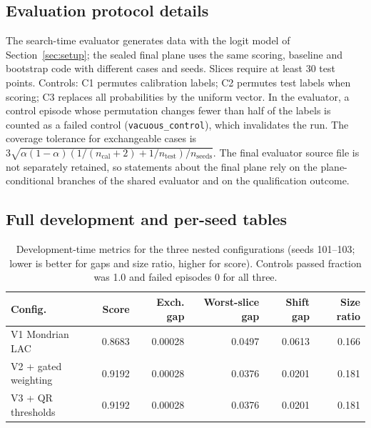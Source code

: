\documentclass{article}
\begin{document}
\subsection{Evaluation protocol details}
The search-time evaluator generates data with the logit model of Section~\ref{sec:setup}; the sealed final plane uses the same scoring, baseline and bootstrap code with different cases and seeds. Slices require at least 30 test points. Controls: C1 permutes calibration labels; C2 permutes test labels when scoring; C3 replaces all probabilities by the uniform vector. In the evaluator, a control episode whose permutation changes fewer than half of the labels is counted as a failed control (\texttt{vacuous\_control}), which invalidates the run. The coverage tolerance for exchangeable cases is $3\sqrt{\alpha(1-\alpha)(1/(n_{\mathrm{cal}}+2)+1/n_{\mathrm{test}})/n_{\mathrm{seeds}}}$. The final evaluator source file is not separately retained, so statements about the final plane rely on the plane-conditional branches of the shared evaluator and on the qualification outcome.

\subsection{Full development and per-seed tables}
\begin{table}[h]
\centering
\caption{Development-time metrics for the three nested configurations (seeds 101--103; lower is better for gaps and size ratio, higher for score). Controls passed fraction was 1.0 and failed episodes 0 for all three.}
\label{tab:dev}
\begin{tabular}{lrrrrr}
\toprule
Config. & Score & Exch. gap & Worst-slice gap & Shift gap & Size ratio \\
\midrule
V1 Mondrian LAC & 0.8683 & 0.00028 & 0.0497 & 0.0613 & 0.166 \\
V2 + gated weighting & 0.9192 & 0.00028 & 0.0376 & 0.0201 & 0.181 \\
V3 + QR thresholds & 0.9192 & 0.00028 & 0.0376 & 0.0201 & 0.181 \\
\bottomrule
\end{tabular}
\end{table}
\end{document}
